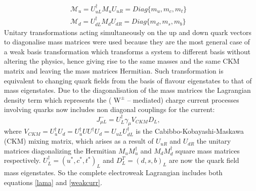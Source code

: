 \begin{equation}
\begin{split}
\mathcal{M}_{u} = U_{uL}^{\dagger}M_{u}U_{uR} = Diag\{m_{u},m_{c},m_{t}\}
\\
\mathcal{M}_{d} = U_{dL}^{\dagger}M_{d}U_{dR} = Diag\{m_{d},m_{s},m_{b}\}
\end{split}
\end{equation}
\newline
\indent Unitary transformations acting simultaneously on the up and down quark vectors \cite{fritz} to diagonalise mass matrices were used because they are the most general case of a weak basis transformation which transforms a system to different basis without altering the physics, hence giving rise to the same masses and the same CKM matrix and leaving the mass matrices Hermitian. Such transformation is equivalent to changing quark fields from the basis of flavour eigenstates to that of mass eigenstates.
\newline
\indent Due to the diagonalisation of the mass matrices the Lagrangian density term which represents the ( $\text{W}^\pm$ -- mediated) charge current processes involving quarks now includes non diagonal couplings for the current:
\begin{equation}\label{weakcurr}
J_{\mu L}^-= U_{L}^{\dagger}\gamma_\mu V_{CKM}D_{L},
\end{equation}
where  $V_{CKM}= U_u^{\dagger} U_d= U_u^{\dag} U U^{\dag} U_d = U_{uL} U_{dL}^\dag$ is the Cabibbo-Kobayashi-Maskawa (CKM) mixing matrix, which arises as a result of $U_{uR}$ and $U_{dR}$ the unitary matrices diagonalizing the Hermitian $M_uM_u^\dagger$ and $M_dM_d^\dagger$ square mass matrices respectively. $U_{L}^\dagger =( u^{*}, c^{*}, t^{*})_L$ and $D_{L}^T=(d,s,b)_L$ are now the quark field mass eigenstates. So the complete electroweak Lagrangian includes both equations \ref{lama} and \ref{weakcurr}.

